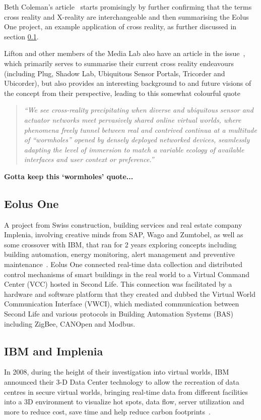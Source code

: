 Beth Coleman's article~\cite{Coleman2009} starts promisingly by further confirming that the terms cross reality and X-reality are interchangeable and then summarising the Eolus One project, an example application of cross reality, as further discussed in section \ref{subsec:eolus_one}.

Lifton and other members of the Media Lab also have an article in the issue~\cite{Lifton2009}, which primarily serves to summarise their current cross reality endeavours (including Plug, Shadow Lab, Ubiquitous Sensor Portals, Tricorder and Ubicorder), but also provides an interesting background to and future visions of the concept from their perspective, leading to this somewhat colourful quote

\begin{quote}
\textit{``We see cross-reality precipitating when diverse and ubiquitous sensor and actuator networks meet pervasively shared online virtual worlds, where phenomena freely tunnel between real and contrived continua at a multitude of ``wormholes'' opened by densely deployed networked devices, seamlessly adapting the level of immersion to match a variable ecology of available interfaces and user context or preference.''}
\end{quote}

\textbf{Gotta keep this `wormholes' quote...}

\subsection{Eolus One}
\label{subsec:eolus_one}
A project from Swiss construction, building services and real estate company Implenia, involving creative minds from SAP, Wago and Zumtobel, as well as some crossover with IBM, that ran for 2 years exploring concepts including building automation, energy monitoring, alert management and preventive maintenance~\cite{Coleman2009, UgoTrade2007}. Eolus One connected real-time data collection and distributed control mechanisms of smart buildings in the real world to a Virtual Command Center (VCC) hosted in Second Life. This connection was facilitated by a hardware and software platform that they created and dubbed the Virtual World Communication Interface (VWCI), which mediated communication between Second Life and various protocols in Building Automation Systems (BAS) including ZigBee, CANOpen and Modbus.

\subsection{IBM and Implenia}
In 2008, during the height of their investigation into virtual worlds, IBM announced their 3-D Data Center technology to allow the recreation of data centres in secure virtual worlds, bringing real-time data from different facilities into a 3D environment to visualize hot spots, data flow, server utilization and more to reduce cost, save time and help reduce carbon footprints~\cite{IBM2008, Marketwire2008}.
	
